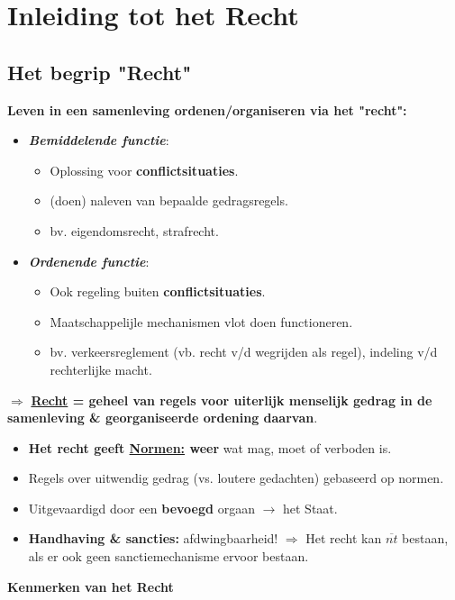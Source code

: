 \section{Inleiding tot het Recht}

\subsection*{Het begrip "Recht"}
\textbf{Leven in een samenleving ordenen/organiseren via het "recht":}
\begin{itemize}
	\item \textit{\textbf{Bemiddelende functie}}:
	\begin{itemize}
		\item Oplossing voor \textbf{conflictsituaties}.
		\item (doen) naleven van bepaalde gedragsregels.
		\item  bv. eigendomsrecht, strafrecht.
	\end{itemize}
	\item \textit{\textbf{Ordenende functie}}:
	\begin{itemize}
		\item Ook regeling buiten \textbf{conflictsituaties}.
		\item Maatschappelijle mechanismen vlot doen functioneren.
		\item bv. verkeersreglement (vb. recht v/d wegrijden als regel), indeling v/d rechterlijke macht.
	\end{itemize}
\end{itemize}
$\Rightarrow$ \textbf{\underline{Recht} = geheel van regels voor uiterlijk menselijk gedrag in de samenleving \& georganiseerde ordening daarvan}.
\begin{itemize}
	\item \textbf{Het recht geeft \underline{Normen:} weer} wat mag, moet of verboden is.
	\item Regels over uitwendig gedrag (vs. loutere gedachten) gebaseerd op normen.
	\item Uitgevaardigd door een \textbf{bevoegd} orgaan $\rightarrow$ het Staat.
	\item \textbf{Handhaving \& sancties:} afdwingbaarheid! $\Rightarrow$ Het recht kan $\overline{nt}$ bestaan, als er ook geen sanctiemechanisme ervoor bestaan.
\end{itemize}
\textbf{Kenmerken van het Recht}
